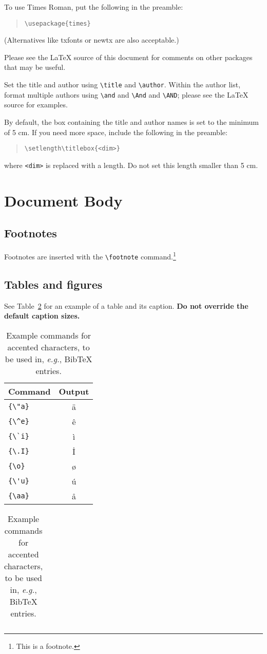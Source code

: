 \documentclass[11pt]{article}
\begin{document}
To use Times Roman, put the following in the preamble:
\begin{quote}
\begin{verbatim}
\usepackage{times}
\end{verbatim}
\end{quote}
(Alternatives like txfonts or newtx are also acceptable.)

Please see the \LaTeX{} source of this document for comments on other packages that may be useful.

Set the title and author using \verb|\title| and \verb|\author|. Within the author list, format multiple authors using \verb|\and| and \verb|\And| and \verb|\AND|; please see the \LaTeX{} source for examples.

By default, the box containing the title and author names is set to the minimum of 5 cm. If you need more space, include the following in the preamble:
\begin{quote}
\begin{verbatim}
\setlength\titlebox{<dim>}
\end{verbatim}
\end{quote}
where \verb|<dim>| is replaced with a length. Do not set this length smaller than 5 cm.

\section{Document Body}

\subsection{Footnotes}

Footnotes are inserted with the \verb|\footnote| command.\footnote{This is a footnote.}

\subsection{Tables and figures}

See Table~\ref{tab:accents} for an example of a table and its caption.
\textbf{Do not override the default caption sizes.}

\begin{table}
\centering
\begin{tabular}{lc}
\hline
\textbf{Command} & \textbf{Output}\\
\hline
\verb|{\"a}| & {\"a} \\
\verb|{\^e}| & {\^e} \\
\verb|{\`i}| & {\`i} \\ 
\verb|{\.I}| & {\.I} \\ 
\verb|{\o}| & {\o} \\
\verb|{\'u}| & {\'u}  \\ 
\verb|{\aa}| & {\aa}  \\\hline
\end{tabular}
\begin{tabular}{lc}
\hline
\end{tabular}
\caption{Example commands for accented characters, to be used in, \emph{e.g.}, Bib\TeX{} entries.}
\label{tab:accents}
\end{table}
\end{document}
